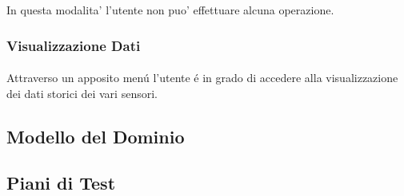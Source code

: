In questa modalita' l'utente non puo' effettuare alcuna operazione.

\subsubsection{Visualizzazione Dati}

\paragraph{} Attraverso un apposito men\'u l'utente \'e in grado di accedere alla visualizzazione dei dati storici dei vari sensori.

\subsection{Modello del Dominio}

\subsection{Piani di Test}

